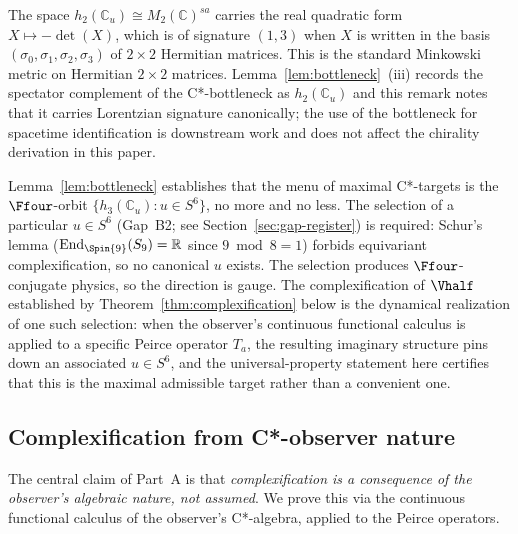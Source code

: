 \begin{remark}\label{rem:minkowski}
The space $h_2(\mathbb{C}_u)\cong M_2(\mathbb{C})^{sa}$ carries the
real quadratic form $X\mapsto -\det(X)$, which is of signature
$(1,3)$ when $X$ is written in the basis
$(\sigma_0,\sigma_1,\sigma_2,\sigma_3)$ of $2\times 2$ Hermitian
matrices.  This is the standard Minkowski metric on Hermitian
$2\times 2$ matrices.  Lemma~\ref{lem:bottleneck}~(iii) records the
spectator complement of the C*-bottleneck as $h_2(\mathbb{C}_u)$ and
this remark notes that it carries Lorentzian signature canonically;
the use of the bottleneck for spacetime identification is downstream
work and does not affect the chirality derivation in this paper.
\end{remark}

\begin{remark}\label{rem:sel-vs-force}
Lemma~\ref{lem:bottleneck} establishes that the menu of maximal
C*-targets is the $\Ffour$-orbit
$\{h_3(\mathbb{C}_u):u\in S^6\}$, no more and no less.  The selection
of a particular $u\in S^6$ (Gap~B2; see
Section~\ref{sec:gap-register}) is required: Schur's lemma
($\mathrm{End}_{\Spin{9}}(S_9)=\mathbb{R}$ since $9\bmod 8=1$)
forbids equivariant complexification, so no canonical $u$ exists.
The selection produces $\Ffour$-conjugate physics, so the direction
is gauge.  The complexification of $\Vhalf$ established by
Theorem~\ref{thm:complexification} below is the dynamical realization
of one such selection: when the observer's continuous functional
calculus is applied to a specific Peirce operator $T_a$, the resulting
imaginary structure pins down an associated $u\in S^6$, and the
universal-property statement here certifies that this is the maximal
admissible target rather than a convenient one.
\end{remark}

\subsection{Complexification from C*-observer nature}\label{sec:complexification-arg}

The central claim of Part~A is that \emph{complexification is a
consequence of the observer's algebraic nature, not assumed}.  We
prove this via the continuous functional calculus of the observer's
C*-algebra, applied to the Peirce operators.

